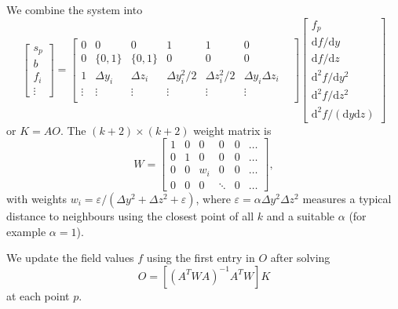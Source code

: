 \documentclass{article}
\begin{document}
We combine the system into
\begin{equation}
\begin{bmatrix}
s_p \\ 
b      \\ 
f_i      \\ 
\vdots
\end{bmatrix}
=
\begin{bmatrix}
0 & 0        & 0        & 1            & 1            & 0 \\
0 &  \{0, 1\}        & \{0, 1\}        & 0            & 0            & 0 \\
1 & \Delta y_i & \Delta z_i & \Delta y_i^2/2 & \Delta z_i^2/2 & \Delta y_i \Delta z_i \\
\vdots & \vdots & \vdots & \vdots & \vdots & \vdots & \\
\end{bmatrix}
\begin{bmatrix}
f_p \\ 
\mathrm{d}f/\mathrm{d}y      \\ 
\mathrm{d}f/\mathrm{d}z      \\ 
\mathrm{d}^2f/\mathrm{d}y^2  \\ 
\mathrm{d}^2f/\mathrm{d}z^2  \\
\mathrm{d}^2f/(\mathrm{d}y\mathrm{d}z)
\end{bmatrix}
\end{equation}
or $K=A O$.
The $(k+2) \times (k+2)$ weight matrix is
\begin{equation}
W=
\begin{bmatrix}
1 & 0 & 0 & 0 & 0 & \hdots \\
0 & 1 & 0 & 0 & 0 & \hdots \\
0 & 0 & w_i & 0 & 0 & \hdots \\
0 & 0 & 0 & \ddots & 0 & \hdots
\end{bmatrix},
\end{equation}
with weights $w_i=\varepsilon/(\Delta y^2 + \Delta z^2 + \varepsilon)$, where $\varepsilon=\alpha \Delta y^2 \Delta z^2$ measures a typical distance to neighbours using the closest point of all $k$ and a suitable $\alpha$ (for example $\alpha=1$).

We update the field values $f$ using the first entry in $O$ after solving
\begin{equation}
O=\left[ \left( A^T W A\right)^{-1} A^T W \right] K 
\end{equation}
at each point $p$.
\end{document}

